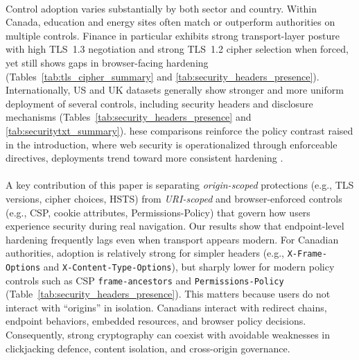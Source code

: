 \documentclass[pdflatex,sn-mathphys-num]{sn-jnl}
\numberwithin{equation}{section}
\theoremstyle{thmstyleone}
\theoremstyle{thmstyletwo}%
\theoremstyle{thmstylethree}%
\begin{document}
\paragraph{\color{red}{RQ2: How does adoption vary by sector and jurisdiction?}}
Control adoption varies substantially by both sector and country. Within Canada, education and energy sites often match or
outperform authorities on multiple controls. Finance in particular exhibits strong transport-layer posture with high TLS~1.3 negotiation and 
strong TLS~1.2 cipher selection when forced,
yet still shows gaps in browser-facing hardening (Tables~\ref{tab:tls_cipher_summary} and \ref{tab:security_headers_presence}). Internationally, US and UK datasets
generally show stronger and more uniform deployment of several controls, including security headers and 
disclosure mechanisms (Tables~\ref{tab:security_headers_presence} and \ref{tab:securitytxt_summary}). 
hese comparisons reinforce the policy contrast raised in the introduction,
where web security is operationalized through enforceable directives, deployments trend toward more consistent
hardening \cite{omb-m-15-13,cisa_bod_18_01,uk-using-https-service-manual}.



\paragraph{\color{red}{RQ3: To what extent do failures occur at the endpoint level rather than the origin level?}}
A key contribution of this paper is separating \emph{origin-scoped} protections (e.g., TLS versions, cipher choices, HSTS) from \emph{URI-scoped} and
browser-enforced controls (e.g., CSP, cookie attributes, Permissions-Policy) that govern how users experience security
during real navigation. Our results show that endpoint-level hardening frequently lags even when transport appears modern. 
For Canadian authorities, adoption is relatively strong for simpler headers (e.g., \texttt{X-Frame-Options} and \texttt{X-Content-Type-Options}), 
but sharply lower for modern policy controls such as CSP \texttt{frame-ancestors} and \texttt{Permissions-Policy} (Table~\ref{tab:security_headers_presence}). 
This matters because users do not interact with ``origins'' in isolation. Canadians interact with redirect chains, endpoint
behaviors, embedded resources, and browser policy decisions. Consequently, strong cryptography can
coexist with avoidable weaknesses in clickjacking defence, content isolation, and cross-origin governance.
\end{document}

